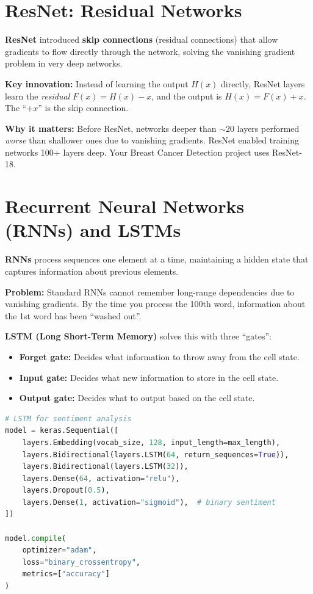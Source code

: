 \documentclass[12pt, a4paper, oneside]{book}
\begin{document}
\section{ResNet: Residual Networks}

\textbf{ResNet} introduced \textbf{skip connections} (residual connections) that allow gradients to flow directly through the network, solving the vanishing gradient problem in very deep networks.

\textbf{Key innovation:} Instead of learning the output $H(x)$ directly, ResNet layers learn the \emph{residual} $F(x) = H(x) - x$, and the output is $H(x) = F(x) + x$. The ``$+ x$'' is the skip connection.

\textbf{Why it matters:} Before ResNet, networks deeper than $\sim$20 layers performed \emph{worse} than shallower ones due to vanishing gradients. ResNet enabled training networks 100+ layers deep. Your Breast Cancer Detection project uses ResNet-18.

\section{Recurrent Neural Networks (RNNs) and LSTMs}

\textbf{RNNs} process sequences one element at a time, maintaining a hidden state that captures information about previous elements.

\textbf{Problem:} Standard RNNs cannot remember long-range dependencies due to vanishing gradients. By the time you process the 100th word, information about the 1st word has been ``washed out''.

\textbf{LSTM (Long Short-Term Memory)} solves this with three ``gates'':
\begin{itemize}[leftmargin=2em]
    \item \textbf{Forget gate:} Decides what information to throw away from the cell state.
    \item \textbf{Input gate:} Decides what new information to store in the cell state.
    \item \textbf{Output gate:} Decides what to output based on the cell state.
\end{itemize}

\begin{lstlisting}[language=Python, caption={LSTM for text classification}]
# LSTM for sentiment analysis
model = keras.Sequential([
    layers.Embedding(vocab_size, 128, input_length=max_length),
    layers.Bidirectional(layers.LSTM(64, return_sequences=True)),
    layers.Bidirectional(layers.LSTM(32)),
    layers.Dense(64, activation="relu"),
    layers.Dropout(0.5),
    layers.Dense(1, activation="sigmoid"),  # binary sentiment
])

model.compile(
    optimizer="adam",
    loss="binary_crossentropy",
    metrics=["accuracy"]
)
\end{lstlisting}
\end{document}
